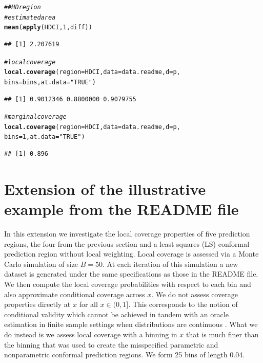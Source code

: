 \documentclass[11pt]{article}\usepackage[]{graphicx}\usepackage[]{color}
\makeatletter
\newcommand{\hlnum}[1]{\textcolor[rgb]{0.686,0.059,0.569}{#1}}%
\newcommand{\hlstr}[1]{\textcolor[rgb]{0.192,0.494,0.8}{#1}}%
\newcommand{\hlcom}[1]{\textcolor[rgb]{0.678,0.584,0.686}{\textit{#1}}}%
\newcommand{\hlstd}[1]{\textcolor[rgb]{0.345,0.345,0.345}{#1}}%
\newcommand{\hlkwc}[1]{\textcolor[rgb]{0.333,0.667,0.333}{#1}}%
\newcommand{\hlkwd}[1]{\textcolor[rgb]{0.737,0.353,0.396}{\textbf{#1}}}%
\newenvironment{kframe}{%
 \def\at@end@of@kframe{}%
 \ifinner\ifhmode%
  \def\at@end@of@kframe{\end{minipage}}%
  \begin{minipage}{\columnwidth}%
 \fi\fi%
 \def\FrameCommand##1{\hskip\@totalleftmargin \hskip-\fboxsep
 \colorbox{shadecolor}{##1}\hskip-\fboxsep
     \hskip-\linewidth \hskip-\@totalleftmargin \hskip\columnwidth}%
 \MakeFramed {\advance\hsize-\width
   \@totalleftmargin\z@ \linewidth\hsize
   \@setminipage}}%
 {\par\unskip\endMakeFramed%
 \at@end@of@kframe}
\newenvironment{knitrout}{}{} %
\makeatother
\begin{document}
\begin{knitrout}
\begin{kframe}
\begin{alltt}
\hlcom{## HD region}
\hlcom{# estimated area}
\hlkwd{mean}\hlstd{(}\hlkwd{apply}\hlstd{(HDCI,} \hlnum{1}\hlstd{, diff))}
\end{alltt}
\begin{verbatim}
## [1] 2.207619
\end{verbatim}
\begin{alltt}
\hlcom{# local coverage}
\hlkwd{local.coverage}\hlstd{(}\hlkwc{region} \hlstd{= HDCI,} \hlkwc{data} \hlstd{= data.readme,} \hlkwc{d} \hlstd{= p,}
  \hlkwc{bins} \hlstd{= bins,} \hlkwc{at.data} \hlstd{=} \hlstr{"TRUE"}\hlstd{)}
\end{alltt}
\begin{verbatim}
## [1] 0.9012346 0.8800000 0.9079755
\end{verbatim}
\begin{alltt}
\hlcom{# marginal coverage}
\hlkwd{local.coverage}\hlstd{(}\hlkwc{region} \hlstd{= HDCI,} \hlkwc{data} \hlstd{= data.readme,} \hlkwc{d} \hlstd{= p,}
  \hlkwc{bins} \hlstd{=} \hlnum{1}\hlstd{,} \hlkwc{at.data} \hlstd{=} \hlstr{"TRUE"}\hlstd{)}
\end{alltt}
\begin{verbatim}
## [1] 0.896
\end{verbatim}
\end{kframe}
\end{knitrout}


\section{Extension of the illustrative example from the README file}

In this extension we investigate the local coverage properties of five 
prediction regions, the four from the previous section and a least squares 
(LS) conformal prediction region without local weighting.  Local coverage is 
assessed via a Monte Carlo simulation of size $B = 50$.  At each iteration 
of this simulation a new dataset is generated under the same specifications 
as those in the README file.  We then compute the local coverage probabilities 
with respect to each bin and also approximate conditional coverage across $x$.  
We do not assess coverage properties directly at $x$ for all $x \in (0,1]$.  
This corresponds to the notion of conditional validity which cannot be 
achieved in tandem with an oracle estimation in finite sample settings when 
distributions are continuous \citep[Section 2.2]{lei2014distribution}.  
What we do instead is we assess local coverage with a binning in $x$ that is 
much finer than the binning that was used to create the misspecified 
parametric and nonparametric conformal prediction regions.  We form 25 bins 
of length 0.04. 
\end{document}
